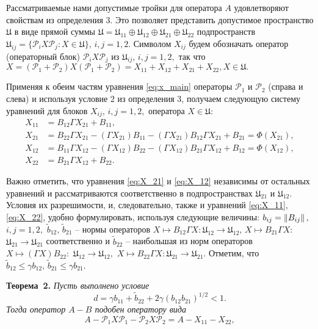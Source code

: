 Рассматриваемые нами допустимые тройки для оператора $A$ удовлетворяют свойствам из определения 3. Это позволяет представить допустимое пространство $\mathfrak{U}$ в виде прямой суммы $\mathfrak{U} = \mathfrak{U}_{11} \oplus \mathfrak{U}_{12} \oplus \mathfrak{U}_{21} \oplus \mathfrak{U}_{22}$ подпространств $\mathfrak{U}_{ij} = \{ \mathcal{P}_i X \mathcal{P}_j \colon X \in \mathfrak{U} \}, \, i,j = 1,2.$ Символом $X_{ij}$ будем обозначать оператор (операторный блок) $\mathcal{P}_i X \mathcal{P}_j$ из $\mathfrak{U}_{ij}, \, i,j = 1,2,$ так что $X = (\mathcal{P}_1 + \mathcal{P}_2) X (\mathcal{P}_1 + \mathcal{P}_2) = X_{11} + X_{12} + X_{21} + X_{22}, X \in \mathfrak{U}.$

Применяя к обеим частям уравнения \eqref{eq:x_main} операторы $\mathcal{P}_1$ и $\mathcal{P}_2$ (справа и слева) и используя условие 2 из определения 3, получаем следующую систему уравнений для блоков $X_{ij}, \, i,j = 1,2,$ оператора $X \in \mathfrak{U}:$
\begin{align}
X_{11} &= B_{12}\Gamma X_{21} + B_{11},  \label{eq:X_11} \\
X_{21} &= B_{22}\Gamma X_{21} - (\Gamma X_{21})B_{11} - (\Gamma X_{21})B_{12}\Gamma X_{21} + B_{21} = \Phi(X_{21}),  \label{eq:X_21} \\
X_{12} &= B_{11}\Gamma X_{12} - (\Gamma X_{12})B_{22} - (\Gamma X_{12})B_{21}\Gamma X_{12} + B_{12} = \Phi(X_{12}), \label{eq:X_12} \\
X_{22} &= B_{21}\Gamma X_{12} + B_{22}. \label{eq:X_22}
\end{align}

Важно отметить, что уравнения \eqref{eq:X_21} и \eqref{eq:X_12} независимы от остальных уравнений и рассматриваются  соответственно в подпространствах $\mathfrak{U}_{21}$ и $\mathfrak{U}_{12}.$ Условия их разрешимости, и, следовательно, также и уравнений \eqref{eq:X_11}, \eqref{eq:X_22}, удобно формулировать, используя следующие величины: $b_{ij} = \left\|B_{ij}\right\|, \,$ ${i,j = 1,2,}$ $\tilde{b}_{12}, \, \tilde{b}_{21}$ -- нормы операторов $X \mapsto B_{12}\Gamma X \colon \mathfrak{U}_{12} \to \mathfrak{U}_{12}, \, X \mapsto B_{21}\Gamma X \colon$\! ${\mathfrak{U}_{21} \to \mathfrak{U}_{21}}$ соответственно и $\tilde{b}_{22}$ -- наибольшая из норм операторов $X \mapsto (\Gamma X)B_{22} \colon$ ${\mathfrak{U}_{12} \to \mathfrak{U}_{12},}$ $X \mapsto B_{22}\Gamma X \colon \mathfrak{U}_{21} \to \mathfrak{U}_{21}.$ Отметим, что $\tilde{b}_{12} \leqslant \gamma b_{12}, \, \tilde{b}_{21} \leqslant \gamma b_{21}.$

\textbf{Теорема~2.}
{ \it Пусть выполнено условие
\begin{equation}
d = \gamma b_{11} + \tilde{b}_{22} + 2\gamma (b_{12}b_{21})^{1/2} < 1.
\label{cond_of_simil}
\end{equation}
Тогда оператор $A - B$ подобен оператору вида
\begin{equation*}
A - \mathcal{P}_1 X \mathcal{P}_1 - \mathcal{P}_2 X \mathcal{P}_2 = A - X_{11} - X_{22},
\end{equation*}
}  